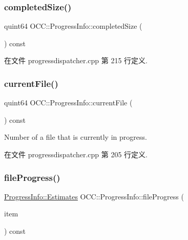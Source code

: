 \subsubsection{\texorpdfstring{completed\+Size()}{completedSize()}}
{\footnotesize\ttfamily quint64 O\+C\+C\+::\+Progress\+Info\+::completed\+Size (\begin{DoxyParamCaption}{ }\end{DoxyParamCaption}) const}



在文件 progressdispatcher.\+cpp 第 215 行定义.

\mbox{\label{class_o_c_c_1_1_progress_info_ae1738dcd4000ae2ea2c5def8e5859f56}} 
\subsubsection{\texorpdfstring{current\+File()}{currentFile()}}
{\footnotesize\ttfamily quint64 O\+C\+C\+::\+Progress\+Info\+::current\+File (\begin{DoxyParamCaption}{ }\end{DoxyParamCaption}) const}

Number of a file that is currently in progress. 

在文件 progressdispatcher.\+cpp 第 205 行定义.

\mbox{\label{class_o_c_c_1_1_progress_info_a7a264725a370e2e2bf41fc283d5971c0}} 
\subsubsection{\texorpdfstring{file\+Progress()}{fileProgress()}}
{\footnotesize\ttfamily \hyperlink{struct_o_c_c_1_1_progress_info_1_1_estimates}{Progress\+Info\+::\+Estimates} O\+C\+C\+::\+Progress\+Info\+::file\+Progress (\begin{DoxyParamCaption}\item[{const \hyperlink{class_o_c_c_1_1_sync_file_item}{Sync\+File\+Item} \&}]{item }\end{DoxyParamCaption}) const}

